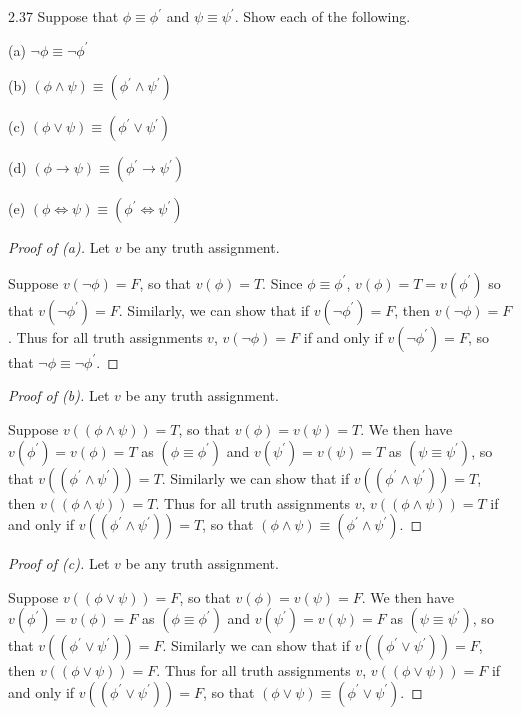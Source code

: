 \documentclass{article}
\theoremstyle{remark}\newtheorem{remark}{Remark}
\theoremstyle{plain}
\begin{document}
2.37 Suppose that $\phi \equiv \phi^{'}$ and $\psi \equiv \psi^{'}$. Show each of the following.

(a) $\neg\phi \equiv \neg\phi^{'}$

(b) $(\phi \land \psi) \equiv (\phi^{'} \land \psi^{'})$

(c) $(\phi \lor \psi) \equiv (\phi^{'} \lor \psi^{'})$

(d) $(\phi \to \psi) \equiv (\phi^{'} \to \psi^{'})$

(e) $(\phi \iff \psi) \equiv (\phi^{'} \iff \psi^{'})$

\begin{proof}[Proof of (a)]
    Let $v$ be any truth assignment.

    Suppose $v(\neg\phi) = F$, so that $v(\phi) = T$. Since $\phi \equiv \phi^{'}$, $v(\phi) = T = v(\phi^{'})$ so that $v(\neg\phi^{'}) = F$. Similarly, we can show that if $v(\neg\phi^{'}) = F$, then $v(\neg\phi) = F$. Thus for all truth assignments $v$, $v(\neg\phi) = F$ if and only if $v(\neg\phi^{'}) = F$, so that $\neg\phi \equiv \neg\phi^{'}$.
\end{proof}

\begin{proof}[Proof of (b)]
    Let $v$ be any truth assignment.

    Suppose $v((\phi \land \psi)) = T$, so that $v(\phi) = v(\psi) = T$. We then have $v(\phi^{'}) = v(\phi) = T$ as $(\phi \equiv \phi^{'})$ and $v(\psi^{'}) = v(\psi) = T$ as $(\psi \equiv \psi^{'})$, so that $v((\phi^{'} \land \psi^{'})) = T$. Similarly we can show that if $v((\phi^{'} \land \psi^{'})) = T$, then $v((\phi \land \psi)) = T$. Thus for all truth assignments $v$, $v((\phi \land \psi)) = T$ if and only if $v((\phi^{'} \land \psi^{'})) = T$, so that $(\phi \land \psi) \equiv (\phi^{'} \land \psi^{'})$.
\end{proof}

\begin{proof}[Proof of (c)]
    Let $v$ be any truth assignment.

    Suppose $v((\phi \lor \psi)) = F$, so that $v(\phi) = v(\psi) = F$. We then have $v(\phi^{'}) = v(\phi) = F$ as $(\phi \equiv \phi^{'})$ and $v(\psi^{'}) = v(\psi) = F$ as $(\psi \equiv \psi^{'})$, so that $v((\phi^{'} \lor \psi^{'})) = F$. Similarly we can show that if $v((\phi^{'} \lor \psi^{'})) = F$, then $v((\phi \lor \psi)) = F$. Thus for all truth assignments $v$, $v((\phi \lor \psi)) = F$ if and only if $v((\phi^{'} \lor \psi^{'})) = F$, so that $(\phi \lor \psi) \equiv (\phi^{'} \lor \psi^{'})$.
\end{proof}
\end{document}
